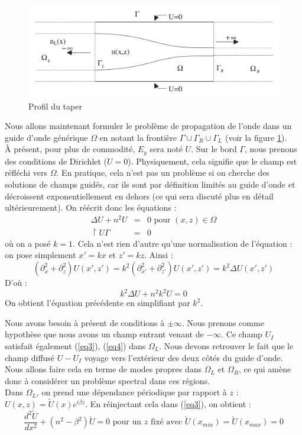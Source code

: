 \documentclass{article}
\begin{document}
\bigskip
\begin{figure}[!h]
	\centering
	\includegraphics[scale=0.35]{images/waveguide-Taper.png}
	\caption{Profil du taper}
	\label{fig:Profil}
\end{figure}
Nous allons maintenant formuler le problème de propagation de l'onde dans un guide d'onde générique $\Omega$ en notant la frontière $\Gamma\cup\Gamma_R\cup\Gamma_L$ (voir la figure \ref{fig:Profil}).\\
À présent, pour plus de commodité, $E_y$ sera noté $U$. Sur le bord $\Gamma$, nous prenons des conditions de Dirichlet ($U=0$). Physiquement, cela signifie que le champ est réfléchi vers $\Omega$. En pratique, cela n'est pas un problème si on cherche des solutions de champs guidés, car ils sont par définition limités au guide d'onde et décroissent exponentiellement en dehors (ce qui sera discuté plus en détail ultérieurement). On réécrit donc les équations :
\begin{eqnarray}
	\label{eq3} \Delta U + n^2U&=&0 \text{ pour } (x,z)\in\Omega\\
	\label{eq4} \restriction{U}{\Gamma}&=&0
\end{eqnarray}
où on a posé $k=1$. Cela n'est rien d'autre qu'une normalisation de l'équation : on pose simplement $x'=kx$ et $z'=kz$. Ainsi : 
	\[(\partial^2_x+\partial^2_z)U(x',z')=k^2 (\partial^2_{x'}+\partial^2_{z'})U(x',z')=k^2\Delta U(x',z')\]
D'où :
	\[k^2\Delta U + n^2k^2 U =0\]
On obtient l'équation précédente en simplifiant par $k^2$.

\bigskip
Nous avons besoin à présent de conditions à $\pm\infty$. Nous prenons comme hypothèse que nous avons un champ entrant venant de $-\infty$. Ce champ $U_I$ satisfait également (\ref{eq3}), (\ref{eq4}) dans $\Omega_L$. Nous devons retrouver le fait que le champ diffusé $U-U_I$ voyage vers l'extérieur des deux côtés du guide d'onde. Nous allons faire cela en terme de modes propres dans $\Omega_L$ et $\Omega_R$, ce qui amène donc à considérer un problème spectral dans ces régions.\\
Dans $\Omega_L$, on prend une dépendance périodique par rapport à $z$ : $U(x,z)=\tilde{U}(x)e^{i\beta z}$. En réinjectant cela dans (\ref{eq3}), on obtient :
\begin{equation}\label{eq5} \frac{d^2\tilde{U}}{dx^2} + (n^2-\beta^2)\tilde{U}=0 \text{ pour un } z \text{ fixé avec } \tilde{U}(x_{min})=\tilde{U}(x_{max})=0 \end{equation}
\end{document}
